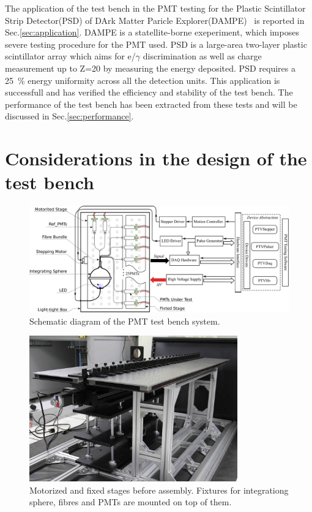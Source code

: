 \documentclass[5p, times]{elsarticle}
\begin{document}
The application of the test bench in the PMT testing for the Plastic Scintillator Strip Detector(PSD) of DArk Matter Paricle Explorer(DAMPE)~\cite{Chang_Jin_dampe} is reported in Sec.\ref{sec:application}.
DAMPE is a statellite-borne  exeperiment, which imposes severe testing procedure for the PMT used.
PSD is a large-area two-layer plastic scintillator array which aims for  e/$\gamma$ discrimination as well as charge measurement up to Z=20 by measuring the energy deposited.
PSD requires a \SI{25}{\percent} energy uniformity across all the detection units.
This application is successfull and has verified the efficiency and stability of the test bench.
The performance of the test bench has been extracted from these tests and will be discussed in Sec.\ref{sec:performance}.

\section{Considerations in the design of the test bench}
\label{sec:design_consideration}

\begin{figure}
 \centering
 \includegraphics[width=160mm]{testbench_overview}
\caption{Schematic diagram of the PMT test bench system.}
\label{fig:testbench_overveiw}
\end{figure}

\begin{figure}[h!]
 \centering
 \includegraphics[width=90mm]{stage1_crop}
\caption{Motorized and fixed stages before assembly.
Fixtures for integrationg sphere, fibres and PMTs are mounted on top of them.}
\label{fig:stages}
\end{figure} 
\end{document}
